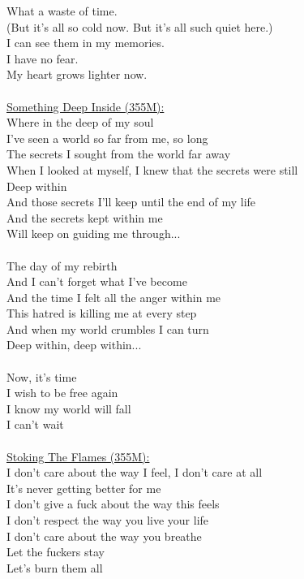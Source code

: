 \documentclass[11pt]{article}
\begin{document}
What a waste of time.\\
(But it's all so cold now. But it's all such quiet here.)\\
I can see them in my memories.\\
I have no fear.\\
My heart grows lighter now.\\
\\
\underline{Something Deep Inside (355M):}\\
Where in the deep of my soul\\
I've seen a world so far from me, so long\\
The secrets I sought from the world far away\\
When I looked at myself, I knew that the secrets were still\\
Deep within\\
And those secrets I'll keep until the end of my life\\
And the secrets kept within me\\
Will keep on guiding me through...\\
\\
The day of my rebirth\\
And I can't forget what I've become\\
And the time I felt all the anger within me\\
This hatred is killing me at every step\\
And when my world crumbles I can turn\\
Deep within, deep within...\\
\\
Now, it's time\\
I wish to be free again\\
I know my world will fall\\
I can't wait\\
\\
\underline{Stoking The Flames (355M):}\\
I don't care about the way I feel, I don't care at all\\
It's never getting better for me\\
I don't give a fuck about the way this feels\\
I don't respect the way you live your life\\
I don't care about the way you breathe\\
Let the fuckers stay\\
Let's burn them all\\
\end{document}
